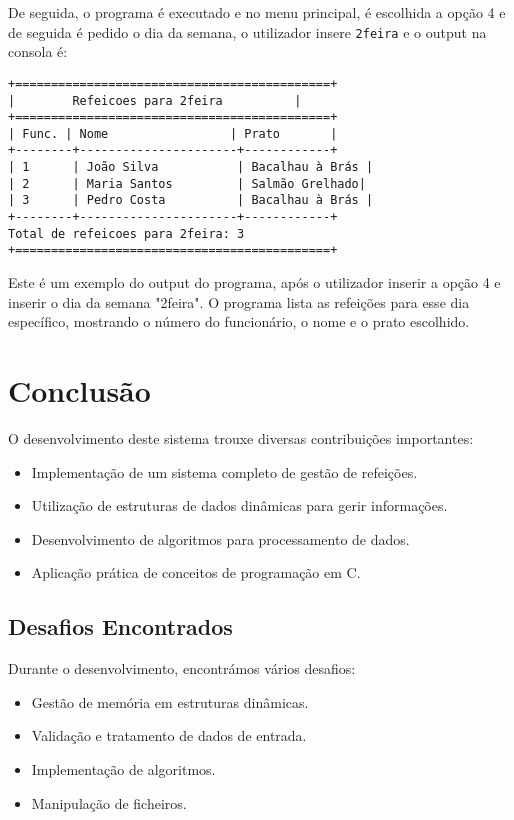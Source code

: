 \documentclass[a4paper,12pt]{report}
\begin{document}
De seguida, o programa é executado e no menu principal, é escolhida a opção 4 e de seguida é pedido o dia da semana, o utilizador insere \texttt{2feira} e o output na consola é:
\begin{lstlisting}[caption={Exemplo de output na consola},label=lst:consola_ex]
+============================================+
|        Refeicoes para 2feira          |
+============================================+
| Func. | Nome                 | Prato       |
+--------+----------------------+------------+
| 1      | João Silva           | Bacalhau à Brás |
| 2      | Maria Santos         | Salmão Grelhado|
| 3      | Pedro Costa          | Bacalhau à Brás |
+--------+----------------------+------------+
Total de refeicoes para 2feira: 3
+============================================+
\end{lstlisting}
Este é um exemplo do output do programa, após o utilizador inserir a opção 4 e inserir o dia da semana "2feira". O programa lista as refeições para esse dia específico, mostrando o número do funcionário, o nome e o prato escolhido.


\chapter{Conclusão}
O desenvolvimento deste sistema trouxe diversas contribuições importantes:
\begin{itemize}
    \item Implementação de um sistema completo de gestão de refeições.
    \item Utilização de estruturas de dados dinâmicas para gerir informações.
    \item Desenvolvimento de algoritmos para processamento de dados.
    \item Aplicação prática de conceitos de programação em C.
\end{itemize}

\section{Desafios Encontrados}
Durante o desenvolvimento, encontrámos vários desafios:
\begin{itemize}
    \item Gestão de memória em estruturas dinâmicas.
    \item Validação e tratamento de dados de entrada.
    \item Implementação de algoritmos.
    \item Manipulação de ficheiros.
\end{itemize}
\end{document}
